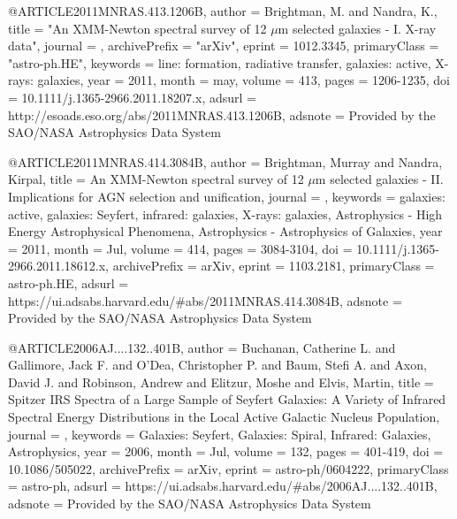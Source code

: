 \documentclass[longauth]{aa}
\begin{document}
@ARTICLE{2011MNRAS.413.1206B,
   author = {{Brightman}, M. and {Nandra}, K.},
    title = "{An XMM-Newton spectral survey of 12 {$\mu$}m selected galaxies - I. X-ray data}",
  journal = {\mnras},
archivePrefix = "arXiv",
   eprint = {1012.3345},
 primaryClass = "astro-ph.HE",
 keywords = {line: formation, radiative transfer, galaxies: active, X-rays: galaxies},
     year = 2011,
    month = may,
   volume = 413,
    pages = {1206-1235},
      doi = {10.1111/j.1365-2966.2011.18207.x},
   adsurl = {http://esoads.eso.org/abs/2011MNRAS.413.1206B},
  adsnote = {Provided by the SAO/NASA Astrophysics Data System}
}

@ARTICLE{2011MNRAS.414.3084B,
       author = {{Brightman}, Murray and {Nandra}, Kirpal},
        title = {An XMM-Newton spectral survey of 12 {\ensuremath{\mu}}m selected galaxies - II. Implications for AGN selection and unification},
      journal = {\mnras},
     keywords = {galaxies: active, galaxies: Seyfert, infrared: galaxies, X-rays: galaxies, Astrophysics - High Energy Astrophysical Phenomena, Astrophysics - Astrophysics of Galaxies},
         year = 2011,
        month = Jul,
       volume = {414},
        pages = {3084-3104},
          doi = {10.1111/j.1365-2966.2011.18612.x},
archivePrefix = {arXiv},
       eprint = {1103.2181},
 primaryClass = {astro-ph.HE},
       adsurl = {https://ui.adsabs.harvard.edu/#abs/2011MNRAS.414.3084B},
      adsnote = {Provided by the SAO/NASA Astrophysics Data System}
}

@ARTICLE{2006AJ....132..401B,
       author = {{Buchanan}, Catherine L. and {Gallimore}, Jack F. and {O'Dea}, Christopher P. and {Baum}, Stefi A. and {Axon}, David J. and {Robinson}, Andrew and {Elitzur}, Moshe and {Elvis}, Martin},
       title = {Spitzer IRS Spectra of a Large Sample of Seyfert Galaxies: A Variety of Infrared Spectral Energy Distributions in the Local Active Galactic Nucleus Population},
      journal = {\aj},
     keywords = {Galaxies: Seyfert, Galaxies: Spiral, Infrared: Galaxies, Astrophysics},
         year = 2006,
        month = Jul,
       volume = {132},
        pages = {401-419},
          doi = {10.1086/505022},
archivePrefix = {arXiv},
       eprint = {astro-ph/0604222},
 primaryClass = {astro-ph},
       adsurl = {https://ui.adsabs.harvard.edu/#abs/2006AJ....132..401B},
      adsnote = {Provided by the SAO/NASA Astrophysics Data System}
}
\end{document}
